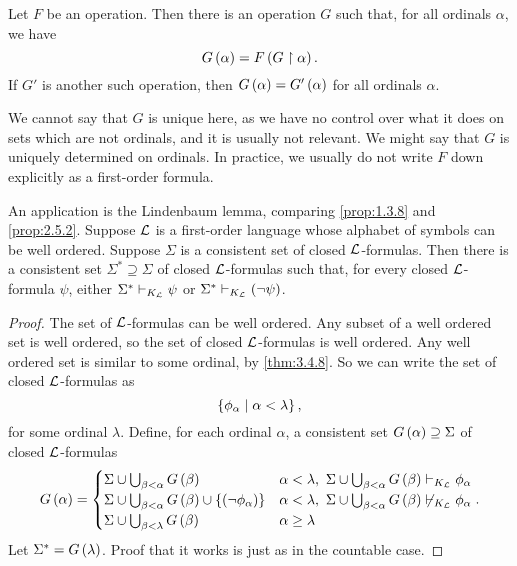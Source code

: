 \begin{theorem}
\label{thm:3.6.1}
Let $ F $ be an operation. Then there is an operation $ G $ such that, for all ordinals $ \alpha $, we have
$$ G\left( \alpha \right) = F\left( G \upharpoonright \alpha \right). $$
If $ G' $ is another such operation, then $ G\left( \alpha \right) = G'\left( \alpha \right) $ for all ordinals $ \alpha $.
\end{theorem}

We cannot say that $ G $ is unique here, as we have no control over what it does on sets which are not ordinals, and it is usually not relevant. We might say that $ G $ is uniquely determined on ordinals. In practice, we usually do not write $ F $ down explicitly as a first-order formula.

\begin{remark}
An application is the Lindenbaum lemma, comparing \ref{prop:1.3.8} and \ref{prop:2.5.2}. Suppose $ \mathcal{L} $ is a first-order language whose alphabet of symbols can be well ordered. Suppose $ \Sigma $ is a consistent set of closed $ \mathcal{L} $-formulas. Then there is a consistent set $ \Sigma^* \supseteq \Sigma $ of closed $ \mathcal{L} $-formulas such that, for every closed $ \mathcal{L} $-formula $ \psi $, either $ \Sigma^* \vdash_{K_{\mathcal{L}}} \psi $ or $ \Sigma^* \vdash_{K_{\mathcal{L}}} \left( \neg \psi \right) $.
\end{remark}

\begin{proof}
The set of $ \mathcal{L} $-formulas can be well ordered. Any subset of a well ordered set is well ordered, so the set of closed $ \mathcal{L} $-formulas is well ordered. Any well ordered set is similar to some ordinal, by \ref{thm:3.4.8}. So we can write the set of closed $ \mathcal{L} $-formulas as
$$ \left\{ \phi_\alpha \mid \alpha < \lambda \right\}, $$
for some ordinal $ \lambda $. Define, for each ordinal $ \alpha $, a consistent set $ G\left( \alpha \right) \supseteq \Sigma $ of closed $ \mathcal{L} $-formulas
$$ G\left( \alpha \right) =
\begin{cases}
\Sigma \cup \bigcup_{\beta < \alpha} G\left( \beta \right) & \alpha < \lambda, \ \Sigma \cup \bigcup_{\beta < \alpha} G\left( \beta \right) \vdash_{K_{\mathcal{L}}} \phi_\alpha \\
\Sigma \cup \bigcup_{\beta < \alpha} G\left( \beta \right) \cup \left\{ \left( \neg \phi_\alpha \right) \right\} & \alpha < \lambda, \ \Sigma \cup \bigcup_{\beta < \alpha} G\left( \beta \right) \not\vdash_{K_{\mathcal{L}}} \phi_\alpha \\
\Sigma \cup \bigcup_{\beta < \lambda} G\left( \beta \right) & \alpha \ge \lambda
\end{cases}.
$$
Let $ \Sigma^* = G\left( \lambda \right) $. Proof that it works is just as in the countable case.
\end{proof}


